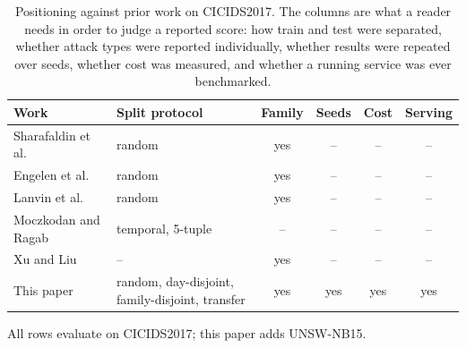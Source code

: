 \begin{table}[htbp]
\centering
\caption{Positioning against prior work on CICIDS2017. The columns are what a
reader needs in order to judge a reported score: how train and test were
separated, whether attack types were reported individually, whether results
were repeated over seeds, whether cost was measured, and whether a running
service was ever benchmarked.}
\label{tab:related}
\scriptsize
\begin{tabular}{@{}p{3.0cm}p{3.1cm}cccc@{}}
\hline
Work & Split protocol & Family & Seeds & Cost & Serving \\
\hline
Sharafaldin et al.~\cite{sharafaldin2018cicids} & random & yes & -- & -- & -- \\
Engelen et al.~\cite{engelen2021troubleshooting} & random & yes & -- & -- & -- \\
Lanvin et al.~\cite{lanvin2023errors} & random & yes & -- & -- & -- \\
Moczkodan and Ragab~\cite{moczkodan2026transformers} & temporal, 5-tuple & -- & -- & -- & -- \\
Xu and Liu~\cite{xu2025robust} & -- & yes & -- & -- & -- \\
\hline
This paper & random, day-disjoint, family-disjoint, transfer & yes & yes & yes & yes \\
\hline
\end{tabular}
\par\smallskip
\scriptsize All rows evaluate on CICIDS2017; this paper adds UNSW-NB15.
\end{table}
